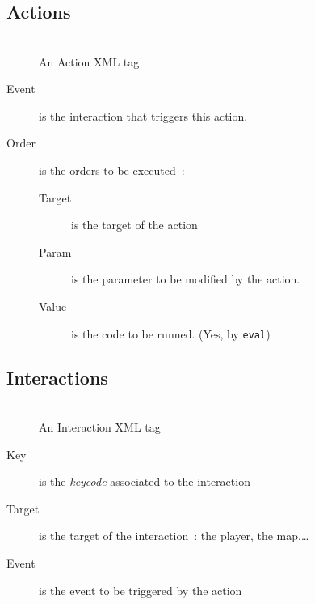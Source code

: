 \documentclass[a4paper, 11pt]{beamer}
\begin{document}
\subsection{Actions}

\begin{frame}
    \frametitle{\subsecname}
    \begin{figure}
        \begin{adjustwidth}{0.1\textwidth}{}
            \scriptsize{\inputminted{xml}{test_files/actions.xml}}
        \end{adjustwidth}
        \caption{An Action XML tag}
    \end{figure}
    \begin{small}
        \begin{adjustwidth}{-0.1\textwidth}{}
            \begin{description}
                \item[Event] is the interaction that triggers this action.
                \item[Order] is the orders to be executed~:
                    \begin{description}
                        \item[Target] is the target of the action
                        \item[Param] is the parameter to be modified by the
                            action.
                        \item[Value] is the code to be runned. (Yes, by
                            \texttt{eval})
                    \end{description}
            \end{description}
        \end{adjustwidth}
    \end{small}
\end{frame}

\subsection{Interactions}

\begin{frame}
    \frametitle{\subsecname}
    \begin{figure}
        \begin{adjustwidth}{0.1\textwidth}{}
            \scriptsize{\inputminted{xml}{test_files/interactions.xml}}
        \end{adjustwidth}
        \caption{An Interaction XML tag}
    \end{figure}
    \begin{small}
        \begin{description}
            \item[Key] is the \emph{keycode} associated to the interaction
            \item[Target] is the target of the interaction~: the player, the
                map,\dots
            \item[Event] is the event to be triggered by the action
        \end{description}
    \end{small}
\end{frame}
\end{document}
